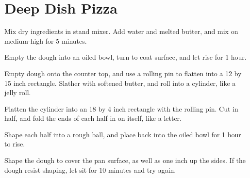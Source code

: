 \section{Deep Dish Pizza}
\begin{recipe}



Mix dry ingredients in stand mixer. Add water and melted butter, and mix on medium-high for 5 minutes.

Empty the dough into an oiled bowl, turn to coat surface, and let rise for 1 hour.

Empty dough onto the counter top, and use a rolling pin to flatten into a 12 by 15 inch rectangle. Slather with softened butter, and roll into a cylinder, like a jelly roll.

Flatten the cylinder into an 18 by 4 inch rectangle with the rolling pin. Cut in half, and fold the ends of each half in on itself, like a letter.

Shape each half into a rough ball, and place back into the oiled bowl for 1 hour to rise.

Shape the dough to cover the pan surface, as well as one inch up the sides. If the dough resist shaping, let sit for 10 minutes and try again.



\end{recipe}

